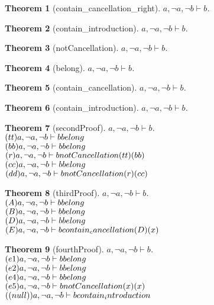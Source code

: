 \documentclass[11pt]{article}
\newtheorem{theorem}{Theorem}
\def\turn{\vdash}
\begin{document}
\begin{theorem}[contain_cancellation_right] $ a, \neg a, \neg b \turn b $.\\
\end{theorem}
\begin{theorem}[contain_introduction] $ a, \neg a, \neg b \turn b $.\\
\end{theorem}
\begin{theorem}[notCancellation] $ a, \neg a, \neg b \turn b $.\\
\end{theorem}
\begin{theorem}[belong] $ a, \neg a, \neg b \turn b $.\\
\end{theorem}
\begin{theorem}[contain_cancellation] $ a, \neg a, \neg b \turn b $.\\
\end{theorem}
\begin{theorem}[contain_introduction] $ a, \neg a, \neg b \turn b $.\\
\end{theorem}
\begin{theorem}[secondProof] $ a, \neg a, \neg b \turn b $.\\
$(tt)a, \neg a, \neg b \turn b \hfill belong  $\\
$(bb)a, \neg a, \neg b \turn b \hfill belong  $\\
$(r)a, \neg a, \neg b \turn b \hfill notCancellation (tt)(bb) $\\
$(cc)a, \neg a, \neg b \turn b \hfill belong  $\\
$(dd)a, \neg a, \neg b \turn b \hfill notCancellation (r)(cc) $\\
\end{theorem}
\begin{theorem}[thirdProof] $ a, \neg a, \neg b \turn b $.\\
$(A)a, \neg a, \neg b \turn b \hfill belong  $\\
$(B)a, \neg a, \neg b \turn b \hfill belong  $\\
$(D)a, \neg a, \neg b \turn b \hfill belong  $\\
$(E)a, \neg a, \neg b \turn b \hfill contain_cancellation (D)(x) $\\
\end{theorem}
\begin{theorem}[fourthProof] $ a, \neg a, \neg b \turn b $.\\
$(e1)a, \neg a, \neg b \turn b \hfill belong  $\\
$(e2)a, \neg a, \neg b \turn b \hfill belong  $\\
$(e4)a, \neg a, \neg b \turn b \hfill belong  $\\
$(e5)a, \neg a, \neg b \turn b \hfill notCancellation (x)(x) $\\
$((null))a, \neg a, \neg b \turn b \hfill contain_introduction  $\\
\end{theorem}
\end{document}
